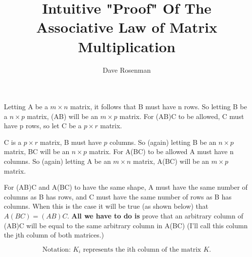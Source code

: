 \documentclass[]{article}
\title{Intuitive "Proof" Of The Associative Law of Matrix Multiplication}
\author{Dave Rosenman}
\date{}
\begin{document}
\maketitle
Letting A be a $m \times n$ matrix, it follows that B must have n rows. So letting B be a $n \times p$ matrix, (AB) will be an $m \times p$ matrix. For (AB)C to be allowed, C must have p rows, so let C be a $p\times r$ matrix.


C is a $p\times r$ matrix, B must have $p$ columns. So (again) letting B be an $n \times p$ matrix, BC will be an $n \times p$ matrix. For A(BC) to be allowed A must have n columns. So (again) letting A be an $m \times n$ matrix, A(BC) will be an $m \times p$ matrix.

For (AB)C and A(BC) to have the same shape, A must have the same number of columns as B has rows, and C must have the same number of rows as B has columns. When this is the case it will be true (as shown below) that $A(BC) = (AB)C$. \textbf{ All we have to do is} prove that an arbitrary column of (AB)C will be equal to the same arbitrary column in A(BC) (I'll call this column the jth column of both matrices.)


$$\text{Notation: } K_i \text{ represents the ith column of the matrix } K.$$
\end{document}
